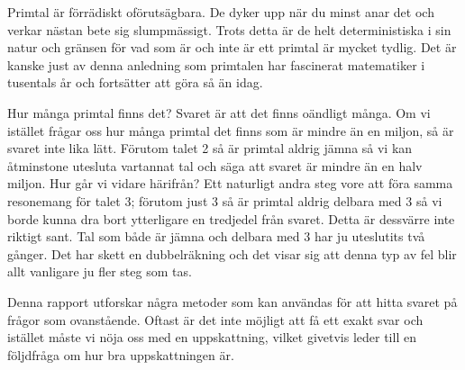 
Primtal är förrädiskt oförutsägbara.
De dyker upp när du minst anar det och verkar nästan bete sig slumpmässigt.
Trots detta är de helt deterministiska i sin natur och gränsen för vad som är och inte är ett primtal är mycket tydlig.
Det är kanske just av denna anledning som primtalen har fascinerat matematiker i tusentals år och fortsätter att göra så än idag.

Hur många primtal finns det? Svaret är att det finns oändligt många.
Om vi istället frågar oss hur många primtal det finns som är mindre än en miljon, så är svaret inte lika lätt.
Förutom talet 2 så är primtal aldrig jämna så vi kan åtminstone utesluta vartannat tal och säga att svaret är mindre än en halv miljon.
Hur går vi vidare härifrån?
Ett naturligt andra steg vore att föra samma resonemang för talet 3;
förutom just 3 så är primtal aldrig delbara med 3 så vi borde kunna dra bort ytterligare en tredjedel från svaret.
Detta är dessvärre inte riktigt sant.
Tal som både är jämna och delbara med 3 har ju uteslutits två gånger.
Det har skett en dubbelräkning och det visar sig att denna typ av fel blir allt vanligare ju fler steg som tas.

Denna rapport utforskar några metoder som kan användas för att hitta svaret på frågor som ovanstående.
Oftast är det inte möjligt att få ett exakt svar och istället måste vi nöja oss med en uppskattning,
vilket givetvis leder till en följdfråga om hur bra uppskattningen är.

